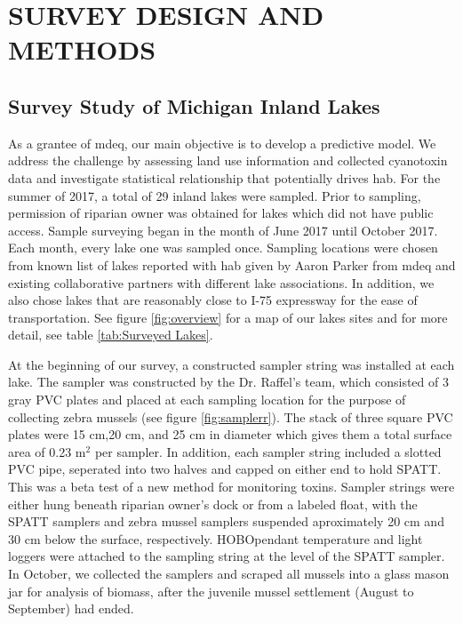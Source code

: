 \chapter{SURVEY DESIGN AND METHODS}
\section{Survey Study of Michigan Inland Lakes} 
As a grantee of \gls{mdeq}, our main objective is to develop a predictive model. We address the challenge by assessing land use information and collected cyanotoxin data and investigate statistical relationship that potentially drives \gls{hab}. For the summer of 2017, a total of 29 inland lakes were sampled. Prior to sampling, permission of riparian owner was obtained for lakes which did not have public access. Sample surveying began in the month of June 2017 until October 2017. Each month, every lake one was sampled once. Sampling locations were chosen from known list of lakes reported with \gls{hab} given by Aaron Parker from \gls{mdeq} and existing collaborative partners with different lake associations. In addition, we also chose lakes that are reasonably close to I-75 expressway for the ease of transportation. See figure \ref{fig:overview} for a map of our lakes sites and for more detail, see table \ref{tab:Surveyed Lakes}.

At the beginning of our survey, a constructed sampler string was installed at each lake. The sampler was constructed by the Dr. Raffel's team, which consisted of 3 gray PVC plates and placed at each sampling location for the purpose of collecting zebra mussels (see figure \ref{fig:samplerr}). The stack of three square PVC plates were  15 cm,20 cm, and 25 cm in diameter which gives them a total surface area of 0.23 m$^2$ per sampler. In addition, each sampler string included a slotted PVC pipe, seperated into two halves and capped on either end to hold SPATT. This was a beta test of a new method for monitoring toxins. Sampler strings were either hung beneath riparian owner's dock or from a labeled float, with the SPATT samplers and zebra mussel samplers suspended aproximately 20 cm and 30 cm below the surface, respectively. HOBO\texttrademark pendant temperature and light loggers were attached to the sampling string at the level of the SPATT sampler. In October, we collected the samplers and scraped all mussels into a glass mason jar for analysis of biomass, after the juvenile mussel settlement (August to September) had ended.


